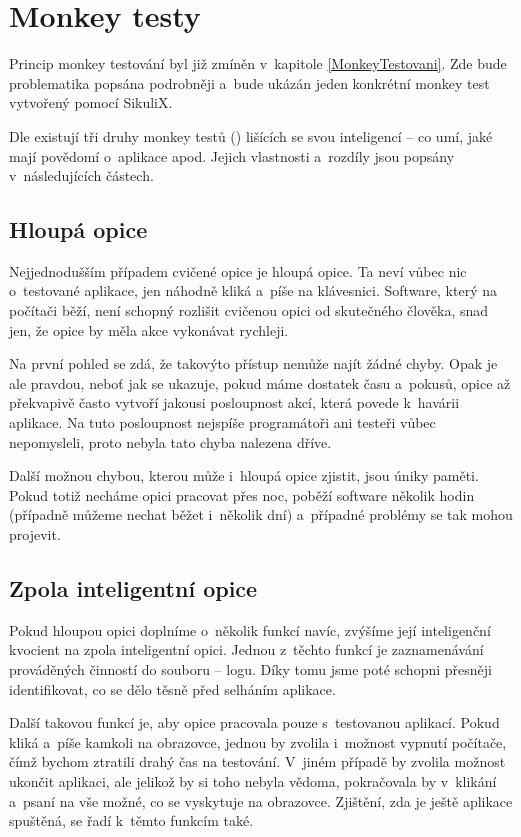 \chapter{Monkey testy}
Princip monkey testování byl již zmíněn v~kapitole \ref{MonkeyTestovani}. Zde bude problematika popsána podrobněji a~bude ukázán jeden konkrétní monkey test vytvořený pomocí SikuliX.

Dle \citep{Patton} existují tři druhy monkey testů () lišících se svou inteligencí -- co umí, jaké mají povědomí o~aplikace apod. Jejich vlastnosti a~rozdíly jsou popsány v~následujících částech.

	\section{Hloupá opice}
	Nejjednodušším případem cvičené opice je hloupá opice. Ta neví vůbec nic o~testované aplikace, jen náhodně kliká a~píše na klávesnici. Software, který na počítači běží, není schopný rozlišit cvičenou opici od skutečného člověka, snad jen, že opice by měla akce vykonávat rychleji.
	
	Na první pohled se zdá, že takovýto přístup nemůže najít žádné chyby. Opak je ale pravdou, neboť jak se ukazuje, pokud máme dostatek času a~pokusů, opice až překvapivě často vytvoří jakousi posloupnost akcí, která povede k~havárii aplikace. Na tuto posloupnost nejspíše programátoři ani testeři vůbec nepomysleli, proto nebyla tato chyba nalezena dříve.
	
	Další možnou chybou, kterou může i~hloupá opice zjistit, jsou úniky paměti. Pokud totiž necháme opici pracovat přes noc, poběží software několik hodin (případně můžeme nechat běžet i~několik dní) a~případné problémy se tak mohou projevit.
	
	\section{Zpola inteligentní opice}
	Pokud hloupou opici doplníme o~několik funkcí navíc, zvýšíme její inteligenční kvocient na zpola inteligentní opici. Jednou z~těchto funkcí je zaznamenávání prováděných činností do souboru -- logu. Díky tomu jsme poté schopni přesněji identifikovat, co se dělo těsně před selháním aplikace.
	
	Další takovou funkcí je, aby opice pracovala pouze s~testovanou aplikací. Pokud kliká a~píše kamkoli na obrazovce, jednou by zvolila i~možnost vypnutí počítače, čímž bychom ztratili drahý čas na testování. V~jiném případě by zvolila možnost ukončit aplikaci, ale jelikož by si toho nebyla vědoma, pokračovala by v~klikání a~psaní na vše možné, co se vyskytuje na obrazovce. Zjištění, zda je ještě aplikace spuštěná, se řadí k~těmto funkcím také.
	
